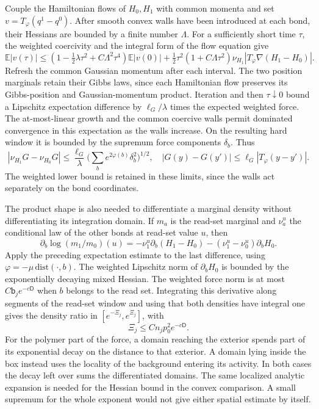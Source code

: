 \documentclass[11pt,letterpaper,reqno]{amsart}
\theoremstyle{definition}
\theoremstyle{remark}
\begin{document}
Couple the Hamiltonian flows of $H_0,H_1$ with common momenta and
set $v=T_\varphi(q^1-q^0)$. After smooth convex walls have been
introduced at each bond, their Hessians are bounded by a finite
number $\Lambda$. For a sufficiently short time $\tau$, the
weighted coercivity and the integral form of the flow equation give
\[
 \mathbb E|v(\tau)|
 \le(1-\tfrac12\lambda\tau^2+C\Lambda^2\tau^4)
                      \mathbb E|v(0)|
 +\tfrac12\tau^2(1+C\Lambda\tau^2)
            \nu_{H_1}|T_\varphi\nabla(H_1-H_0)|.
\]
Refresh the common Gaussian momentum after each interval. The two
position marginals retain their Gibbs laws, since each Hamiltonian
flow preserves its Gibbs-position and Gaussian-momentum product.
Iteration and then $\tau\downarrow0$ bound a Lipschitz expectation
difference by $\ell_G/\lambda$ times the expected weighted force.
The at-most-linear growth and the common coercive walls permit
dominated convergence in this expectation as the walls increase.
On the resulting hard window it is bounded by the supremum force
components $\delta_b$. Thus
\[
 |\nu_{H_1}G-\nu_{H_0}G|
 \le\frac{\ell_G}{\lambda}
                       \Big(\sum_be^{2\varphi(b)}\delta_b^2\Big)^{1/2},
 \quad
 |G(y)-G(y')|\le\ell_G|T_\varphi(y-y')|.
\]
The weighted lower bound is retained in these limits, since the
walls act separately on the bond coordinates.

The product shape is also needed to differentiate a marginal
density without differentiating its integration domain. If $m_a$
is the read-set marginal and $\nu_a^u$ the conditional law of the
other bonds at read-set value $u$, then
\[
 \partial_b\log(m_1/m_0)(u)
 =-\nu_1^u\partial_b(H_1-H_0)
               -(\nu_1^u-\nu_0^u)\partial_bH_0.
\]
Apply the preceding expectation estimate to the last difference,
using $\varphi=-\mu\,\mathrm{dist}(\cdot,b)$. The weighted
Lipschitz norm of $\partial_bH_0$ is bounded by the exponentially
decaying mixed Hessian. The weighted force norm is at most
$C\mathsf b_je^{-c\mathsf D}$ when $b$ belongs to the read set.
Integrating this derivative along segments of the read-set window
and using that both densities have integral one gives the density
ratio in $[e^{-\Xi_j},e^{\Xi_j}]$, with
\begin{equation}\label{eq:inserted-box-decoupling}
 \Xi_j\le C n_jp_0^2e^{-c\mathsf D}.
\end{equation}
For the polymer part of the force, a domain reaching the exterior
spends part of its exponential decay on the distance to that
exterior. A domain lying inside the box instead uses the locality
of the background entering its activity. In both cases the decay
left over sums the differentiated domains. The same localized
analytic expansion is needed for the Hessian bound in the convex
comparison. A small supremum for the whole exponent would not
give either spatial estimate by itself.
\end{document}
